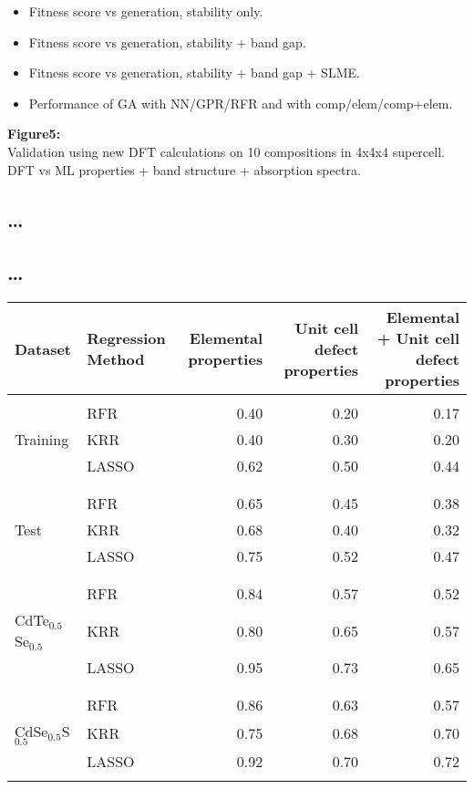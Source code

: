 \documentclass[11pt]{article}
\begin{document}
\begin{itemize}
\item Fitness score vs generation, stability only.

\item Fitness score vs generation, stability + band gap.

\item Fitness score vs generation, stability + band gap + SLME.

\item Performance of GA with NN/GPR/RFR and with comp/elem/comp+elem.\\
\end{itemize}

\textbf{Figure5:}\\
Validation using new DFT calculations on 10 compositions in 4x4x4
supercell. DFT vs ML properties + band structure + absorption spectra.\\

\subsection{\ldots{}}
\label{sec:org3258682}
\subsection{\ldots{}}
\label{sec:org46a4e72}
\begin{center}
\begin{tabular}{llrrr}
\textbf{Dataset} & \textbf{Regression Method} & \textbf{Elemental properties} & \textbf{Unit cell defect properties} & \textbf{Elemental + Unit cell defect properties}\\
\hline
 &  &  &  & \\
 & RFR & 0.40 & 0.20 & 0.17\\
Training & KRR & 0.40 & 0.30 & 0.20\\
 & LASSO & 0.62 & 0.50 & 0.44\\
 &  &  &  & \\
 &  &  &  & \\
 & RFR & 0.65 & 0.45 & 0.38\\
Test & KRR & 0.68 & 0.40 & 0.32\\
 & LASSO & 0.75 & 0.52 & 0.47\\
 &  &  &  & \\
 &  &  &  & \\
 & RFR & 0.84 & 0.57 & 0.52\\
CdTe\(_{0.5}\)Se\(_{0.5}\) & KRR & 0.80 & 0.65 & 0.57\\
 & LASSO & 0.95 & 0.73 & 0.65\\
 &  &  &  & \\
 &  &  &  & \\
 & RFR & 0.86 & 0.63 & 0.57\\
CdSe\(_{0.5}\)S\(_{0.5}\) & KRR & 0.75 & 0.68 & 0.70\\
 & LASSO & 0.92 & 0.70 & 0.72\\
 &  &  &  & \\
\end{tabular}
\end{center}
\end{document}
